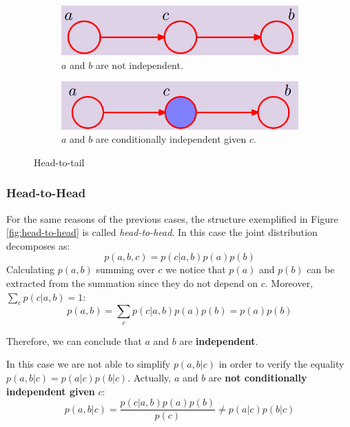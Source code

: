 \begin{figure}[H]
	\centering
	\begin{subfigure}
		[t]{0.49\textwidth}
		\centering
		\includegraphics[width=\linewidth]{
			images/08_BayesianNetworks_headToTailNoEvidence.png
		}
		\caption{$a$ and $b$ are not independent.}
		\label{fig:unSelectedHeadToTail}
	\end{subfigure}
	\hfill
	\begin{subfigure}
		[t]{0.49\textwidth}
		\centering
		\includegraphics[width=\linewidth]{
			images/08_BayesianNetworks_headToTailEvidence.png
		}
		\caption{$a$ and $b$ are conditionally independent given $c$.}
		\label{fig:selectedHeadToTail}
	\end{subfigure}

	\caption{Head-to-tail}
	\label{fig:head-to-tail}
\end{figure}

\subsubsection{Head-to-Head}
For the same reasons of the previous cases, the structure exemplified in Figure \ref{fig:head-to-head}
is called \textit{head-to-head}. In this case the joint distribution decomposes as:
\[
	p(a,b,c) = p(c|a,b)p(a)p(b)
\]
Calculating $p(a,b)$ summing over $c$ we notice that $p(a)$ and $p(b)$ can be
extracted from the summation since they do not depend on $c$. Moreover,
$\sum_{c}p(c|a,b) = 1$:
\[
	p(a,b) = \sum_{c}p(c|a,b) p(a) p(b) = p(a)p(b)
\]

Therefore, we can conclude that $a$ and $b$ are \textbf{independent}.
\newline

In this case we are not able to simplify $p(a,b|c)$ in order to verify the
equality $p(a,b|c) = p(a|c)p(b|c)$. Actually, $a$ and $b$ are \textbf{not
conditionally independent given} $c$:
\[
	p(a,b|c) = \frac{p(c|a,b)p(a)p(b)}{p(c)}\neq p(a|c)p(b|c)
\]

